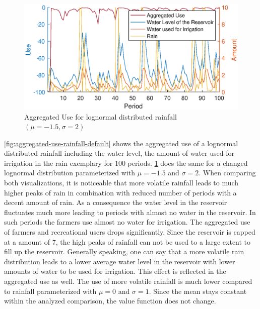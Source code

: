 \documentclass[12pt, a4paper, oneside]{article}
\begin{document}
\begin{figure}[ht]
\includegraphics[width=1\textwidth]{figures/aggregated-use-rainfall-more-volatile.eps}
\caption{Aggregated Use for lognormal distributed rainfall $(\mu=-1.5, \sigma=2)$}
\label{fig:aggregated-use-rainfall-more-volatile}
\end{figure}
\ref{fig:aggregated-use-rainfall-default} shows the aggregated use of a lognormal distributed rainfall including the water level, the amount of water used for irrigation in the rain exemplary for 100 periods. \ref{fig:aggregated-use-rainfall-more-volatile} does the same for a changed lognormal distribution parameterized with $\mu=-1.5$ and $\sigma=2$.
When comparing both visualizations, it is noticeable that more volatile rainfall leads to much higher peaks of rain in combination with reduced number of periods with a decent amount of rain. 
As a consequence the water level in the reservoir fluctuates much more leading to periods with almost no water in the reservoir. 
In such periods the farmers use almost no water for irrigation.
The aggregated use of farmers and recreational users drops significantly.
Since the reservoir is capped at a amount of 7, the high peaks of rainfall can not be used to a large extent to fill up the reservoir.
Generally speaking, one can say that a more volatile rain distribution leads to a lower average water level in the reservoir with lower amounts of water to be used for irrigation.
This effect is reflected in the aggregated use as well. 
The use of more volatile rainfall is much lower compared to rainfall parameterized with $\mu=0$ and $\sigma=1$.
Since the mean stays constant within the analyzed comparison, the value function does not change.
\clearpage
\end{document}
